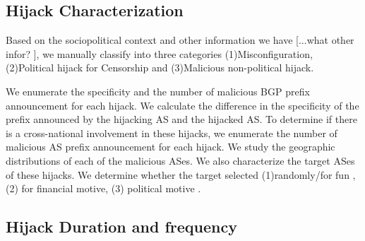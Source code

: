 \subsection{Hijack Characterization }

Based on the sociopolitical context and other information we have [...what other infor? ], we manually classify into three categories (1)Misconfiguration, (2)Political hijack for Censorship and (3)Malicious non-political hijack. 

We enumerate the specificity and the number of malicious BGP prefix announcement for each hijack. We calculate the difference in the specificity of the prefix announced by the hijacking AS and the hijacked AS. To determine if there is a cross-national involvement in these hijacks, we enumerate the number of malicious AS prefix announcement for each hijack. We study the geographic distributions of each of the malicious ASes.
We also characterize the target ASes of these hijacks. We determine whether the target selected (1)randomly/for fun , (2) for financial motive, (3) political motive .
\subsection{Hijack Duration and frequency}


